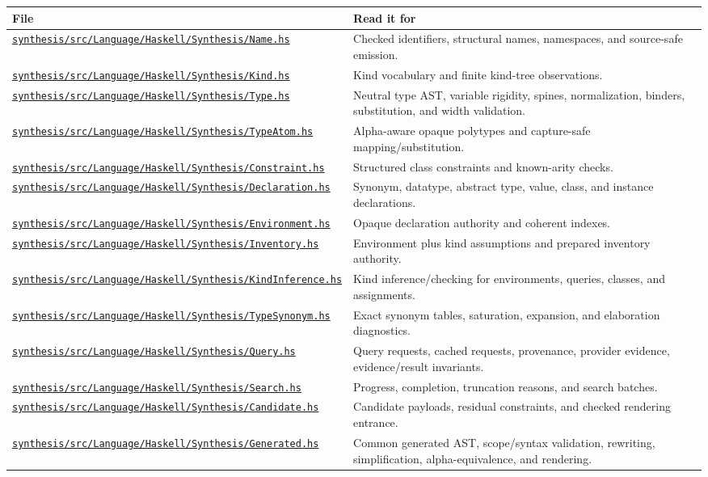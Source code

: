 \documentclass[10pt,letterpaper,oneside]{report}
\def\DjexBase{https://github.com/VladimirReshetnikov/Djex/blob/d3d9662598460316bdcd177ce6768c521e764aa8/}
\newcommand{\dpath}[1]{\href{\DjexBase#1}{\nolinkurl{#1}}}
\begin{document}
\begin{longtable}{@{}L{0.43\textwidth}L{0.49\textwidth}@{}}
\toprule
\textbf{File} & \textbf{Read it for} \\
\midrule
\endhead
\dpath{synthesis/src/Language/Haskell/Synthesis/Name.hs} & Checked identifiers, structural names, namespaces, and source-safe emission. \\
\dpath{synthesis/src/Language/Haskell/Synthesis/Kind.hs} & Kind vocabulary and finite kind-tree observations. \\
\dpath{synthesis/src/Language/Haskell/Synthesis/Type.hs} & Neutral type AST, variable rigidity, spines, normalization, binders, substitution, and width validation. \\
\dpath{synthesis/src/Language/Haskell/Synthesis/TypeAtom.hs} & Alpha-aware opaque polytypes and capture-safe mapping/substitution. \\
\dpath{synthesis/src/Language/Haskell/Synthesis/Constraint.hs} & Structured class constraints and known-arity checks. \\
\dpath{synthesis/src/Language/Haskell/Synthesis/Declaration.hs} & Synonym, datatype, abstract type, value, class, and instance declarations. \\
\dpath{synthesis/src/Language/Haskell/Synthesis/Environment.hs} & Opaque declaration authority and coherent indexes. \\
\dpath{synthesis/src/Language/Haskell/Synthesis/Inventory.hs} & Environment plus kind assumptions and prepared inventory authority. \\
\dpath{synthesis/src/Language/Haskell/Synthesis/KindInference.hs} & Kind inference/checking for environments, queries, classes, and assignments. \\
\dpath{synthesis/src/Language/Haskell/Synthesis/TypeSynonym.hs} & Exact synonym tables, saturation, expansion, and elaboration diagnostics. \\
\dpath{synthesis/src/Language/Haskell/Synthesis/Query.hs} & Query requests, cached requests, provenance, provider evidence, evidence/result invariants. \\
\dpath{synthesis/src/Language/Haskell/Synthesis/Search.hs} & Progress, completion, truncation reasons, and search batches. \\
\dpath{synthesis/src/Language/Haskell/Synthesis/Candidate.hs} & Candidate payloads, residual constraints, and checked rendering entrance. \\
\dpath{synthesis/src/Language/Haskell/Synthesis/Generated.hs} & Common generated AST, scope/syntax validation, rewriting, simplification, alpha-equivalence, and rendering. \\

\end{longtable}
\end{document}
